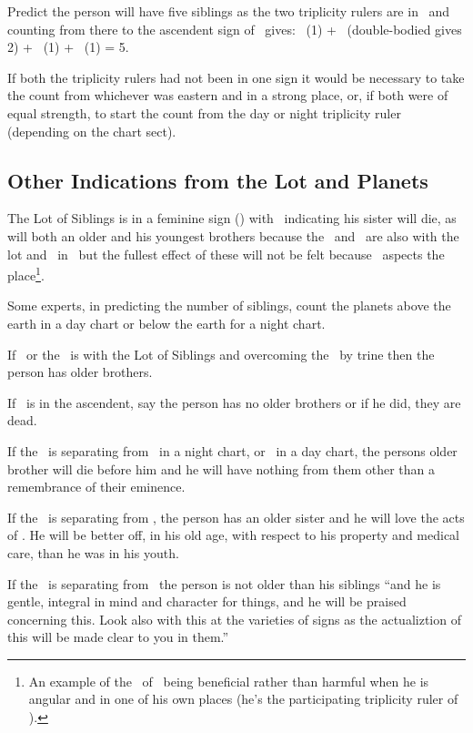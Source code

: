 Predict the person will have five siblings as the two triplicity rulers are in \Taurus\, and counting from there to the ascendent sign of \Leo\, gives: \Taurus\, (1) + \Gemini\, (double-bodied gives 2) + \Cancer\, (1) + \Leo\, (1) = 5.

If both the triplicity rulers had not been in one sign it would be necessary to take the count from whichever was eastern and in a strong place, or, if both were of equal strength, to start the count from the day or night triplicity ruler (depending on the chart sect). 

\subsection{Other Indications from the Lot and Planets}
The Lot of Siblings is in a feminine sign (\Taurus) with \Saturn\, indicating his sister will die, as will both an older and his youngest brothers because the \Sun\, and \Mercury\, are also with the lot and \Saturn\, in \Taurus\, but the fullest effect of these will not be felt because \Jupiter\, aspects the place\footnote{An example of the \Square\, of \Jupiter\, being beneficial rather than harmful when he is angular and in one of his own places (he's the participating triplicity ruler of \Aquarius).}.

Some experts, in predicting the number of siblings, count the planets above the earth in a day chart or below the earth for a night chart. 

If \Jupiter\, or the \Sun\, is with the Lot of Siblings and overcoming the \Moon\, by trine then the person has older brothers.

If \Mercury\, is in the ascendent, say the person has no older brothers or if he did, they are dead.

If the \Moon\, is separating from \Saturn\, in a night chart,  or \Mars\, in a day chart, the persons older brother will die before him and he will have nothing from them other than a remembrance of their eminence.

If the \Moon\, is separating from \Venus, the person has an older sister and he will love the acts of \Venus. He will be better off, in his old age, with respect to his property and medical care,  than he was in his youth.

If the \Moon\, is separating from \Mercury\, the person is not older than his siblings ``and he is gentle, integral in mind and character for things, and he will be praised concerning this. Look also with this at the varieties of signs as the actualiztion of this will be made clear to you in them.''


